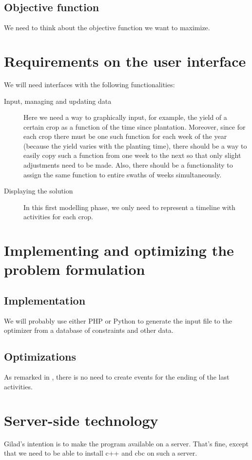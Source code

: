 \documentclass[11pt,reqno]{amsart}
\numberwithin{equation}{section}
\begin{document}
\subsection{Objective function}

We need to think about the objective function we want to  maximize.


\section{Requirements on the user interface}

We will need interfaces with the following functionalities:

\begin{description}
\item[Input, managing and updating data] Here we need a way to graphically input, for
  example, the yield of a certain crop as a function of the time since
  plantation. Moreover, since for each crop there must be one such function for each week
  of the year (because the yield varies with the planting time), there should be a way to
  easily copy such a function from one week to the next so that only slight adjustments
  need to be made. Also, there should be a functionality to assign the same function to
  entire swaths of weeks simultaneously. 

\item[Displaying the solution] In this first modelling phase, we only need to represent a
  timeline with activities for each crop. 
\end{description}


\section{Implementing and optimizing the problem formulation}

\subsection{Implementation}

We will probably use either PHP or Python to generate the input file to the optimizer from
a database of constraints and other data.

\subsection{Optimizations}
As remarked in \cite{artigues-etal11}, there is no need to create
events for the ending of the last activities. 

\section{Server-side technology}

Gilad's intention is to make the program available on a server. That's
fine, except that we need to be able to install c++ and cbc on such a server.



\end{document}
